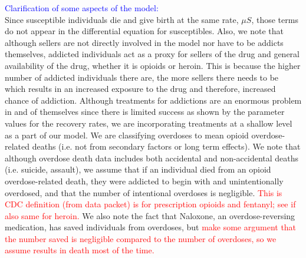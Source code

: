 \documentclass[12pt]{article}
\begin{document}
\textcolor{blue}{Clarification of some aspects of the model:} \\
Since susceptible individuals die and give birth at the same rate, $\mu S$, those terms do not appear in the differential equation for susceptibles. Also, we note that although sellers are not directly involved in the model nor have to be addicts themselves, addicted individuals act as a proxy for sellers of the drug and general availability of the drug, whether it is opioids or heroin. This is because the higher number of addicted individuals there are, the more sellers there needs to be which results in an increased exposure to the drug and therefore, increased chance of addiction. Although treatments for addictions are an enormous problem in and of themselves since there is limited success as shown by the parameter values for the recovery rates, we are incorporating treatments at a shallow level as a part of our model. We are classifying overdoses to mean opioid overdose-related deaths (i.e. not from secondary factors or long term effects). We note that although overdose death data includes both accidental and non-accidental deaths (i.e. suicide, assault), we assume that if an individual died from an opioid overdose-related death, they were addicted to begin with and unintentionally overdosed, and that the number of intentional overdoses is negligible. \textcolor{red}{This is CDC definition (from data packet) is for prescription opioids and fentanyl; see if also same for heroin.}
We also note the fact that Naloxone, an overdose-reversing medication, has saved individuals from overdoses, but \cite{NIDA2} \textcolor{red}{make some argument that the number saved is negligible compared to the number of overdoses, so we assume results in death most of the time.}\\ 
\end{document}
